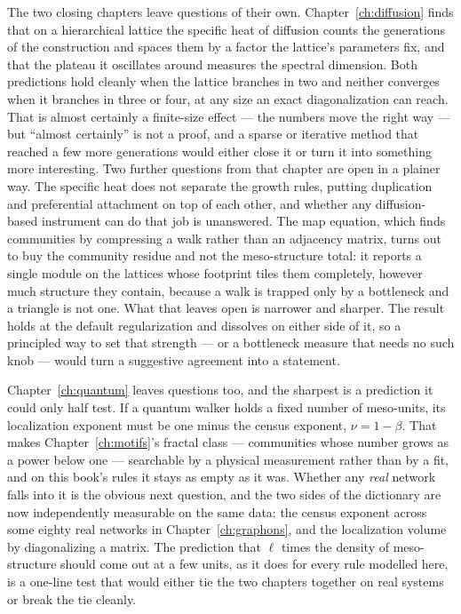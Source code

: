 The two closing chapters leave questions of their own. Chapter~\ref{ch:diffusion}
finds that on a hierarchical lattice the specific heat of diffusion counts the
generations of the construction and spaces them by a factor the lattice's parameters
fix, and that the plateau it oscillates around measures the spectral dimension. Both
predictions hold cleanly when the lattice branches in two and neither converges when it
branches in three or four, at any size an exact diagonalization can reach. That is
almost certainly a finite-size effect --- the numbers move the right way --- but
``almost certainly'' is not a proof, and a sparse or iterative method that reached a
few more generations would either close it or turn it into something more interesting.
Two further questions from that chapter are open in a plainer way. The specific heat
does not separate the growth rules, putting duplication and preferential attachment on
top of each other, and whether any diffusion-based instrument can do that job is
unanswered. The map equation, which finds communities by compressing a walk rather than an
adjacency matrix, turns out to buy the community residue and not the meso-structure
total: it reports a single module on the lattices whose footprint tiles them completely,
however much structure they contain, because a walk is trapped only by a bottleneck and
a triangle is not one. What that leaves open is narrower and sharper. The result holds
at the default regularization and dissolves on either side of it, so a principled way to
set that strength --- or a bottleneck measure that needs no such knob --- would turn a
suggestive agreement into a statement.

Chapter~\ref{ch:quantum} leaves questions too, and the sharpest is a prediction it
could only half test. If a quantum walker holds a fixed number of meso-units, its
localization exponent must be one minus the census exponent, $\nu = 1-\beta$. That
makes Chapter~\ref{ch:motifs}'s fractal class --- communities whose number grows as a
power below one --- searchable by a physical measurement rather than by a fit, and on
this book's rules it stays as empty as it was. Whether any \emph{real} network falls
into it is the obvious next question, and the two sides of the dictionary are now
independently measurable on the same data: the census exponent across some eighty real
networks in Chapter~\ref{ch:graphons}, and the localization volume by diagonalizing a
matrix. The prediction that $\ell$ times the density of meso-structure should come out
at a few units, as it does for every rule modelled here, is a one-line test that would
either tie the two chapters together on real systems or break the tie cleanly.

